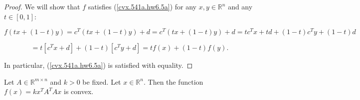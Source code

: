 \begin{proof} We will show that \(f\) satisfies (\ref{cvx.541a.hw6.5a}) for any \(x,y \in \mathbb{R}^n\) and any \(t \in [0,1]\):

\[
f(tx+(1-t)y) =  c^T(tx+(1-t)y) + d =  c^T(tx+(1-t)y) + d  = t c^Tx+ td +(1-t) c^Ty  + (1-t)d
\]

\[
= t[c^Tx + d] +(1-t)[c^Ty + d] = tf(x)+(1-t)f(y).
\]

In particular, (\ref{cvx.541a.hw6.5a}) is satisfied with equality.

\end{proof}

\begin{proposition}\label{cvs.quad.form.cvx} Let $A \in \mathbb{R}^{m \times n}$ and \(k > 0\) be fixed. Let \(x \in \mathbb{R}^n\). Then the function  \( f(x) = k x^TA^TAx\) is convex.

\end{proposition}

